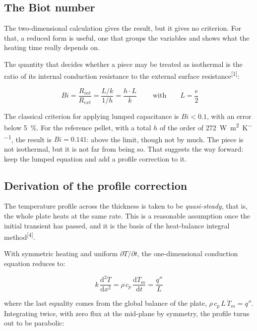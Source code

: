 \documentclass[11pt,a4paper]{article}
\newcommand{\cita}[1]{\textsuperscript{[\textcolor{uji}{#1}]}}
\begin{document}
\subsection{The Biot number}

The two-dimensional calculation gives the result, but it gives no criterion.
For that, a reduced form is useful, one that groups the variables and shows
what the heating time really depends on.

The quantity that decides whether a piece may be treated as isothermal is
the ratio of its internal conduction resistance to the external surface
resistance\cita{1}:

\begin{equation}
\boxed{\;
Bi = \frac{R_{int}}{R_{ext}}
= \frac{L/k}{1/h}
= \frac{h \cdot L}{k}
\;}
\qquad \text{with} \qquad L = \frac{e}{2}
\end{equation}

The classical criterion for applying lumped capacitance is
$Bi < \num{0.1}$, with an error below \SI{5}{\percent}. For the reference
pellet, with a total $h$ of the order of
\SI{272}{\watt\per\meter\squared\per\kelvin}, the result is
$Bi = \num{0.141}$: above the limit, though not by much. The piece is not
isothermal, but it is not far from being so. That suggests the way forward:
keep the lumped equation and add a profile correction to it.

\subsection{Derivation of the profile correction}

The temperature profile across the thickness is taken to be
\emph{quasi-steady}, that is, the whole plate heats at the same rate. This
is a reasonable assumption once the initial transient has passed, and it is
the basis of the heat-balance integral method\cita{4}.

With symmetric heating and uniform $\partial T/\partial t$, the
one-dimensional conduction equation reduces to:

\begin{equation}
k\, \frac{\mathrm{d}^{2}T}{\mathrm{d}x^{2}}
= \rho\, c_p\, \frac{\mathrm{d}T_{m}}{\mathrm{d}t}
= \frac{q''}{L}
\end{equation}

where the last equality comes from the global balance of the plate,
$\rho\, c_p\, L\, \dot{T}_{m} = q''$. Integrating twice, with zero flux at
the mid-plane by symmetry, the profile turns out to be parabolic:
\end{document}
